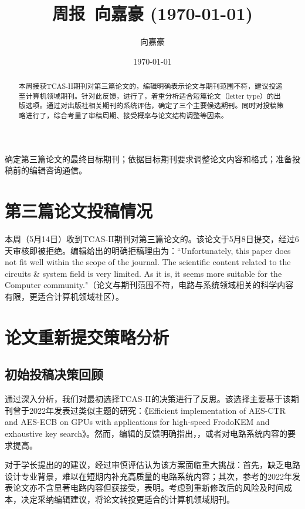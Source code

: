 \documentclass{article}
\title{周报~向嘉豪 (\today)}
\author{向嘉豪}
\date{\today}
\begin{document}
\maketitle

\begin{abstract}
  本周接获TCAS-II期刊对第三篇论文的，编辑明确表示论文与期刊范围不符，建议投递至计算机领域期刊。针对此反馈，进行了，着重分析适合短篇论文（letter type）的出版选项。通过对出版社相关期刊的系统评估，确定了三个主要候选期刊。同时对投稿策略进行了，综合考量了审稿周期、接受概率与论文结构调整等因素。
\end{abstract}

\begin{weekplan}
确定第三篇论文的最终目标期刊；依据目标期刊要求调整论文内容和格式；准备投稿前的编辑咨询通信。
\end{weekplan}

\section{第三篇论文投稿情况}

本周（5月14日）收到TCAS-II期刊对第三篇论文的。该论文于5月8日提交，经过6天审核即被拒绝。编辑给出的明确拒稿理由为：``Unfortunately, this paper does not fit well within the scope of the journal. The scientific content related to the circuits \& system field is very limited. As it is, it seems more suitable for the Computer community."（论文与期刊范围不符，电路与系统领域相关的科学内容有限，更适合计算机领域社区）。

\section{论文重新提交策略分析}

\subsection{初始投稿决策回顾}

通过深入分析，我们对最初选择TCAS-II的决策进行了反思。该选择主要基于该期刊曾于2022年发表过类似主题的研究：《Efficient implementation of AES-CTR and AES-ECB on GPUs with applications for high-speed FrodoKEM and exhaustive key search》。然而，编辑的反馈明确指出，，或者对电路系统内容的要求提高。

对于学长提出的的建议，经过审慎评估认为该方案面临重大挑战：首先，缺乏电路设计专业背景，难以在短期内补充高质量的电路系统内容；其次，参考的2022年发表论文亦不含显著电路内容但获接受，表明。考虑到重新修改后的风险及时间成本，决定采纳编辑建议，将论文转投更适合的计算机领域期刊。
\end{document}

